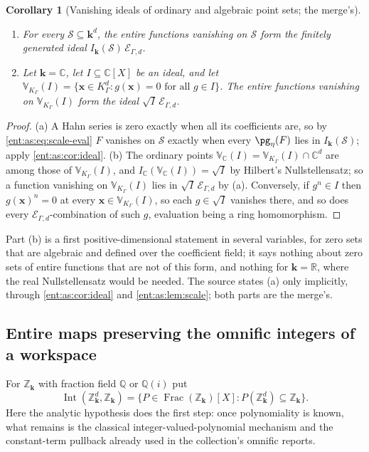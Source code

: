 \documentclass[11pt]{article}
\theoremstyle{plain}
\theoremstyle{plain}
\theoremstyle{plain}
\newtheorem{corollary}[corollary]{Corollary}
\theoremstyle{definition}
\theoremstyle{definition}
\theoremstyle{definition}
\theoremstyle{definition}
\theoremstyle{remark}
\newcommand{\C}{\mathbb C}\newcommand{\R}{\mathbb R}
\newcommand{\Q}{\mathbb Q}\newcommand{\Z}{\mathbb Z}\newcommand{\N}{\mathbb N}
\newcommand{\K}{K_\Gamma}\newcommand{\KD}{K_\Delta}
\newcommand{\kk}{\mathbf k}\newcommand{\PP}{\mathbb P}
\newcommand{\Oz}{\mathbf{Oz}}\newcommand{\Ed}{\mathcal E_{\Gamma,d}}
\newcommand{\Zk}{\Z_{\kk}}\newcommand{\OzK}{\Oz_{\K}}
\DeclareMathOperator{\Int}{Int}\DeclareMathOperator{\ct}{ct}
\begin{document}
\begin{corollary}[Vanishing ideals of ordinary and algebraic point sets; the
merge's]\label{ent:as:cor:vanishing}
\leavevmode
\begin{enumerate}[label=\textnormal{(\alph*)},leftmargin=2em]
\item For every $\mathcal S\subseteq\kk^d$, the entire functions vanishing on
$\mathcal S$ form the finitely generated ideal $I_\kk(\mathcal S)\,\Ed$.
\item Let $\kk=\C$, let $I\subseteq\C[X]$ be an ideal, and let
$\mathbb V_{\K}(I)=\{\mathbf x\in\K^d:g(\mathbf x)=0\text{ for all }g\in I\}$. The
entire functions vanishing on $\mathbb V_{\K}(I)$ form the ideal
$\sqrt I\,\Ed$.
\end{enumerate}
\end{corollary}
\begin{proof}
(a) A Hahn series is zero exactly when all its coefficients are, so by
\eqref{ent:as:eq:scale-eval} $F$ vanishes on $\mathcal S$ exactly when every
$\pg_\eta(F)$ lies in $I_\kk(\mathcal S)$; apply \cref{ent:as:cor:ideal}.
(b) The ordinary points $\mathbb V_\C(I)=\mathbb V_{\K}(I)\cap\C^d$ are among
those of $\mathbb V_{\K}(I)$, and $I_\C(\mathbb V_\C(I))=\sqrt I$ by Hilbert's
Nullstellensatz; so a function vanishing on $\mathbb V_{\K}(I)$ lies in
$\sqrt I\,\Ed$ by (a). Conversely, if $g^n\in I$ then $g(\mathbf x)^n=0$ at every
$\mathbf x\in\mathbb V_{\K}(I)$, so each $g\in\sqrt I$ vanishes there, and so does
every $\Ed$-combination of such $g$, evaluation being a ring homomorphism.
\end{proof}

Part (b) is a first positive-dimensional statement in several variables, for
zero sets that are algebraic and defined over the coefficient field; it says
nothing about zero sets of entire functions that are not of this form, and
nothing for $\kk=\R$, where the real Nullstellensatz would be needed. The
source states (a) only implicitly, through \cref{ent:as:cor:ideal} and
\cref{ent:as:lem:scale}; both parts are the merge's.

\subsection{Entire maps preserving the omnific integers of a workspace}
\label{ent:as:subsec:integer}

For $\Zk$ with fraction field $\Q$ or $\Q(i)$ put
\[
 \Int(\Zk^d,\Zk)=\{P\in\operatorname{Frac}(\Zk)[X]:P(\Zk^d)\subseteq\Zk\}.
\]
Here the analytic hypothesis does the first step: once polynomiality is
known, what remains is the classical integer-valued-polynomial mechanism and
the constant-term pullback already used in the collection's omnific reports.
\end{document}

